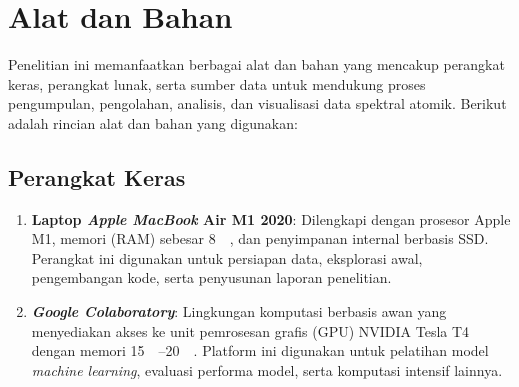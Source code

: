 \section{Alat dan Bahan}
Penelitian ini memanfaatkan berbagai alat dan bahan yang mencakup perangkat keras, perangkat lunak, serta sumber data untuk mendukung proses pengumpulan, pengolahan, analisis, dan visualisasi data spektral atomik. Berikut adalah rincian alat dan bahan yang digunakan:

\subsection{Perangkat Keras}
\begin{enumerate}
  \item \textbf{Laptop \textit{Apple MacBook} Air M1 2020}: Dilengkapi dengan prosesor Apple M1, memori (RAM) sebesar \SI{8}{\giga\byte}, dan penyimpanan internal berbasis SSD. Perangkat ini digunakan untuk persiapan data, eksplorasi awal, pengembangan kode, serta penyusunan laporan penelitian.
  \item \textbf{\textit{Google Colaboratory}}: Lingkungan komputasi berbasis awan yang menyediakan akses ke unit pemrosesan grafis (GPU) NVIDIA Tesla T4 dengan memori \SIrange{15}{20}{\giga\byte}. Platform ini digunakan untuk pelatihan model \textit{machine learning}, evaluasi performa model, serta komputasi intensif lainnya.
\end{enumerate}

